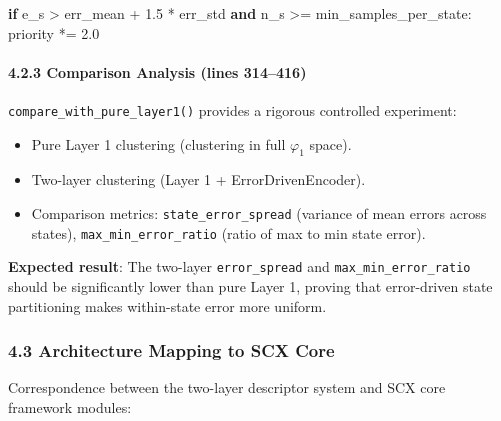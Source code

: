 \documentclass[
  12pt,
]{article}
\newenvironment{Shaded}{}{}
\newcommand{\ControlFlowTok}[1]{\textcolor[rgb]{0.00,0.44,0.13}{\textbf{#1}}}
\newcommand{\FloatTok}[1]{\textcolor[rgb]{0.25,0.63,0.44}{#1}}
\newcommand{\KeywordTok}[1]{\textcolor[rgb]{0.00,0.44,0.13}{\textbf{#1}}}
\newcommand{\NormalTok}[1]{#1}
\newcommand{\OperatorTok}[1]{\textcolor[rgb]{0.40,0.40,0.40}{#1}}
\providecommand{\tightlist}{%
  \setlength{\itemsep}{0pt}\setlength{\parskip}{0pt}}
\begin{document}
\begin{Shaded}
\begin{Highlighting}[]
\ControlFlowTok{if}\NormalTok{ e\_s }\OperatorTok{\textgreater{}}\NormalTok{ err\_mean }\OperatorTok{+} \FloatTok{1.5} \OperatorTok{*}\NormalTok{ err\_std }\KeywordTok{and}\NormalTok{ n\_s }\OperatorTok{\textgreater{}=}\NormalTok{ min\_samples\_per\_state:}
\NormalTok{    priority }\OperatorTok{*=} \FloatTok{2.0}
\end{Highlighting}
\end{Shaded}

\paragraph{4.2.3 Comparison Analysis (lines 314--416)}\label{comparison-analysis}

\texttt{compare\_with\_pure\_layer1()} provides a rigorous controlled experiment:

\begin{itemize}
\tightlist
\item
  Pure Layer 1 clustering (clustering in full $\varphi_1$ space).
\item
  Two-layer clustering (Layer 1 + ErrorDrivenEncoder).
\item
  Comparison metrics: \texttt{state\_error\_spread} (variance of mean errors across states), \texttt{max\_min\_error\_ratio} (ratio of max to min state error).
\end{itemize}

\textbf{Expected result}: The two-layer \texttt{error\_spread} and \texttt{max\_min\_error\_ratio} should be significantly lower than pure Layer 1, proving that error-driven state partitioning makes within-state error more uniform.

\subsubsection{4.3 Architecture Mapping to SCX Core}\label{architecture-mapping}

Correspondence between the two-layer descriptor system and SCX core framework modules:
\end{document}
